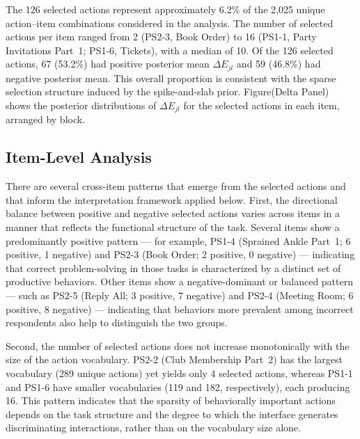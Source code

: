 \documentclass[A4paper,11pt]{article}
\begin{document}
The 126 selected actions represent approximately 6.2\% of the 2{,}025 unique action--item combinations considered in the analysis. The number of selected actions per item ranged from 2 (PS2-3, Book Order) to 16 (PS1-1, Party Invitations Part~1; PS1-6, Tickets), with a median of 10. Of the 126 selected actions, 67 (53.2\%) had positive posterior mean $\Delta E_{jl}$ and 59 (46.8\%) had negative posterior mean. This overall proportion is consistent with the sparse selection structure induced by the spike-and-slab prior. Figure(Delta Panel) shows the posterior distributions of $\Delta E_{jl}$ for the selected actions in each item, arranged by block.



\subsection{Item-Level Analysis}

There are several cross-item patterns that emerge from the selected actions and that inform the interpretation framework applied below. First, the directional balance between positive and negative selected actions varies across items in a manner that reflects the functional structure of the task. Several items show a predominantly positive pattern --- for example, PS1-4 (Sprained Ankle Part~1; 6 positive, 1 negative) and PS2-3 (Book Order; 2 positive, 0 negative) --- indicating that correct problem-solving in those tasks is characterized by a distinct set of productive behaviors. Other items show a negative-dominant or balanced pattern --- such as PS2-5 (Reply All; 3 positive, 7 negative) and PS2-4 (Meeting Room; 6 positive, 8 negative) --- indicating that behaviors more prevalent among incorrect respondents also help to distinguish the two groups.

Second, the number of selected actions does not increase monotonically with the size of the action vocabulary. PS2-2 (Club Membership Part~2) has the largest vocabulary (289 unique actions) yet yields only 4 selected actions, whereas PS1-1 and PS1-6 have smaller vocabularies (119 and 182, respectively), each producing 16. This pattern indicates that the sparsity of behaviorally important actions depends on the task structure and the degree to which the interface generates discriminating interactions, rather than on the vocabulary size alone.
\end{document}

